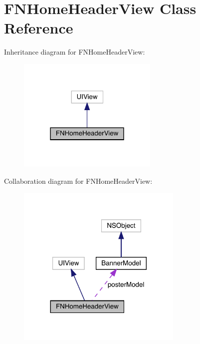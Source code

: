 \hypertarget{interface_f_n_home_header_view}{}\section{F\+N\+Home\+Header\+View Class Reference}
\label{interface_f_n_home_header_view}


Inheritance diagram for F\+N\+Home\+Header\+View\+:\nopagebreak
\begin{figure}[H]
\begin{center}
\leavevmode
\includegraphics[width=190pt]{interface_f_n_home_header_view__inherit__graph}
\end{center}
\end{figure}


Collaboration diagram for F\+N\+Home\+Header\+View\+:\nopagebreak
\begin{figure}[H]
\begin{center}
\leavevmode
\includegraphics[width=224pt]{interface_f_n_home_header_view__coll__graph}
\end{center}
\end{figure}
